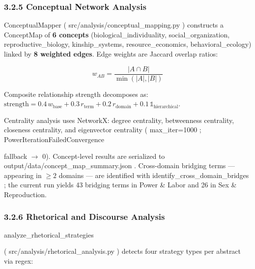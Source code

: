 \documentclass[
]{article}
\numberwithin{equation}{section}
\renewcommand{\texttt}[1]{%
    \colorbox{codebg}{\color{codefg}\ttfamily #1}%
}
\begin{document}
\subsubsection{3.2.5 Conceptual Network
Analysis}\label{conceptual-network-analysis}

\texttt{ConceptualMapper} (\texttt{src/analysis/conceptual\_mapping.py})
constructs a \texttt{ConceptMap} of \textbf{6 concepts}
(biological\_individuality, social\_organization, reproductive\_biology,
kinship\_systems, resource\_economics, behavioral\_ecology) linked by
\textbf{8 weighted edges}. Edge weights are Jaccard overlap ratios:

\begin{equation}\label{eq:jaccard_overlap}
w_{AB} = \frac{|A \cap B|}{\min(|A|, |B|)}
\end{equation}

Composite relationship strength decomposes as:
\(\text{strength} = 0.4\,w_\text{base} + 0.3\,r_\text{term} + 0.2\,r_\text{domain} + 0.1\,\mathbb{1}_\text{hierarchical}\).

Centrality analysis uses NetworkX: degree centrality, betweenness
centrality, closeness centrality, and eigenvector centrality
(\texttt{max\_iter=1000}; \texttt{PowerIterationFailedConvergence}
fallback \(\to\) 0). Concept-level results are serialized to
\texttt{output/data/concept\_map\_summary.json}. Cross-domain bridging
terms --- appearing in \(\geq 2\) domains --- are identified with
\texttt{identify\_cross\_domain\_bridges}; the current run yields 43
bridging terms in Power \& Labor and 26 in Sex \& Reproduction.

\subsubsection{3.2.6 Rhetorical and Discourse
Analysis}\label{rhetorical-and-discourse-analysis}

\texttt{analyze\_rhetorical\_strategies}
(\texttt{src/analysis/rhetorical\_analysis.py}) detects four strategy
types per abstract via regex:
\end{document}
